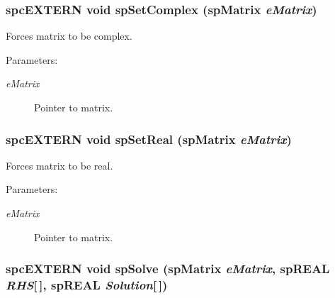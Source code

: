 \subsubsection{\setlength{\rightskip}{0pt plus 5cm}spc\-EXTERN void sp\-Set\-Complex ({\bf sp\-Matrix} {\em e\-Matrix})}\label{spMatrix_8h_a52}


Forces matrix to be complex.\begin{Desc}
\item[Parameters: ]\par
\begin{description}
\item[{\em 
e\-Matrix}]Pointer to matrix. \end{description}
\end{Desc}
\subsubsection{\setlength{\rightskip}{0pt plus 5cm}spc\-EXTERN void sp\-Set\-Real ({\bf sp\-Matrix} {\em e\-Matrix})}\label{spMatrix_8h_a53}


Forces matrix to be real.\begin{Desc}
\item[Parameters: ]\par
\begin{description}
\item[{\em 
e\-Matrix}]Pointer to matrix. \end{description}
\end{Desc}
\subsubsection{\setlength{\rightskip}{0pt plus 5cm}spc\-EXTERN void sp\-Solve ({\bf sp\-Matrix} {\em e\-Matrix}, sp\-REAL {\em RHS}[$\,$], sp\-REAL {\em Solution}[$\,$])}\label{spMatrix_8h_a60}


